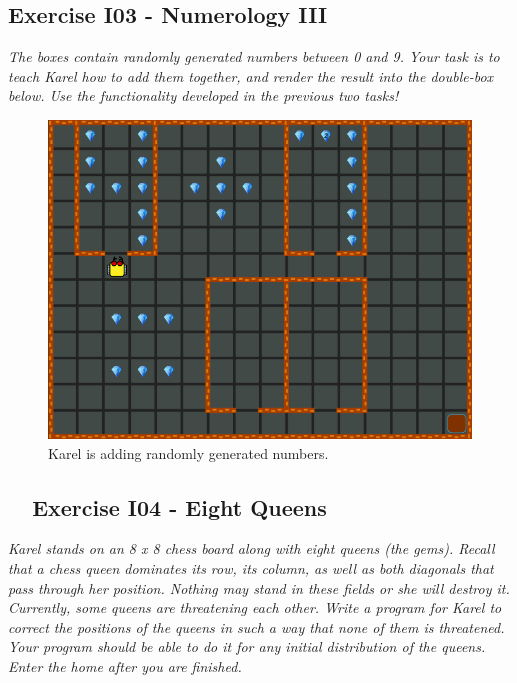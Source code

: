\documentclass[article,A4,12pt]{llncs}
\begin{document}
{{{{\subsection{Exercise I03 - Numerology III}

{\em The boxes contain randomly generated numbers between 0 and 9. Your task is to teach Karel how to 
add them together, and render the result into the double-box below. Use the functionality developed
in the previous two tasks!}\\[-7mm]


\begin{figure}[!ht]
\begin{center}
\includegraphics[height=0.4\textwidth]{img/i03.png}
\end{center}
\vspace{-4mm}
\caption{Karel is adding randomly generated numbers.}
\label{fig:g12}
\end{figure}
\noindent
\newpage

\subsection{\ \ Exercise I04 - Eight Queens}

{\em Karel stands on an 8 x 8 chess board along with eight queens (the gems). Recall that a chess queen dominates its row, its column, as well as both diagonals that pass through her position. Nothing may stand in these fields or she will destroy it. Currently, some queens are threatening each other. Write a program for Karel to correct the positions of the queens in such a way that none of them is threatened. Your program should be able to do it for any initial distribution of the queens. Enter the home after you are finished.}

}}}}
\end{document}
